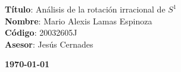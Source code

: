 \documentclass[a4paper,12pt]{report}
\theoremstyle{definition}
\begin{document}
	\begin{center}
		{\Large \textbf{Título}: Análisis de la rotación irracional de $S^1$\\		
		\textbf{Nombre}: Mario Alexis Lamas Espinoza\\		
		\textbf{Código}: 20032605J\\			
		\textbf{Asesor}: Jesús Cernades\\}
	\end{center}

	\begin{center}
		{\Large \textbf{\today}}
	\end{center}
	
	\onehalfspacing
	
	\tableofcontents
	
	
	
	 
	
	
	

\printbibliography[heading=bibintoc]
\end{document}

